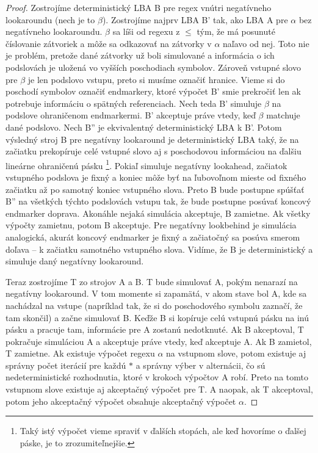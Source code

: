\begin{proof}
Zostrojíme deterministický LBA B pre regex vnútri negatívneho lookaroundu (nech je to $\beta$). Zostrojíme najprv LBA B' tak, ako LBA A pre $\alpha$ bez negatívneho look\-aroundu. $\beta$ sa líši od regexu z $\le$ tým, že má posunuté číslovanie zátvoriek a môže sa odkazovať na zátvorky v $\alpha$ naľavo od nej. Toto nie je problém, pretože dané zátvorky už boli simulované a informácia o ich podslovách je uložená vo vyšších poschodiach symbolov. Zároveň vstupné slovo pre $\beta$ je len podslovo vstupu, preto si musíme označiť hranice. Vieme si do poschodí symbolov označiť endmarkery, ktoré výpočet B' smie prekročiť len ak potrebuje informáciu o spätných referenciach. Nech teda B' simuluje $\beta$ na podslove ohraničenom endmarkermi. B' akceptuje práve vtedy, keď $\beta$ matchuje dané podslovo. Nech B'' je ekvivalentný deterministický LBA k B'. Potom výsledný stroj B pre negatívny lookaround je deterministický LBA taký, že na začiatku prekopíruje celé vstupné slovo aj s poschodovou informáciou na ďalšiu lineárne ohraničenú pásku \footnote{Taký istý výpočet vieme spraviť v ďalších stopách, ale keď hovoríme o ďalšej páske, je to zrozumiteľnejšie.}. Pokiaľ simuluje negatívny lookahead, začiatok vstupného podslova je fixný a koniec môže byť na ľubovoľnom mieste od fixného začiatku až po samotný koniec vstupného slova. Preto B bude postupne spúšťať B'' na všetkých týchto podslovách vstupu tak, že bude postupne posúvať koncový endmarker doprava. Akonáhle nejaká simulácia akceptuje, B zamietne. Ak všetky výpočty zamietnu, potom B akceptuje. Pre negatívny lookbehind je simulácia analogická, akurát koncový endmarker je fixný a začiatočný sa posúva smerom doľava -- k začiatku samotného vstupného slova. Vidíme, že B je deterministický a simuluje daný negatívny lookaround.

Teraz zostrojíme T zo strojov A a B. T bude simulovať A, pokým nenarazí na negatívny lookaround. V tom momente si zapamätá, v akom stave bol A, kde sa nachádzal na vstupe (napríklad tak, že si do poschodového symbolu zaznačí, že tam skončil) a začne simulovať B. Keďže B si kopíruje celú vstupnú pásku na inú pásku a pracuje tam, informácie pre A zostanú nedotknuté. Ak B akceptoval, T pokračuje simuláciou A a akceptuje práve vtedy, keď akceptuje A. Ak B zamietol, T zamietne. Ak existuje výpočet regexu $\alpha$ na vstupnom slove, potom existuje aj správny počet iterácií pre každú $*$ a správny výber v alternácii, čo sú nedeterministické rozhodnutia, ktoré v krokoch výpočtov A robí. Preto na tomto vstupnom slove existuje aj akceptačný výpočet pre T. A naopak, ak T akceptoval, potom jeho akceptačný výpočet obsahuje akceptačný výpočet $\alpha$.


\end{proof}
